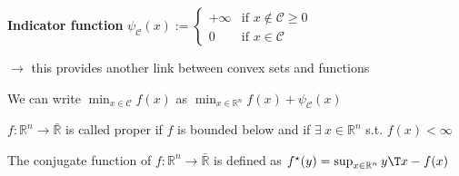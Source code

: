 \textbf{Indicator function}
$\psi_\mathcal{C}(x) := \begin{cases} +\infty &\text{if } x \notin\mathcal{C} \ge 0 \\ 0 &\text{if } x \in\mathcal{C} \end{cases}$

$\rightarrow$ this provides another link between convex sets and functions

We can write
$\min_{x \in \mathcal{C}}f(x)$ as
$\min_{x \in \mathbb{R}^{n}}f(x) + \psi_\mathcal{C}(x)$

\begin{definition}[3]
	$f: \mathbb{R}^{n}\rightarrow\bar{\mathbb{R}}$ is called proper
	if $f$ is bounded below and
	if $\exists\ x \in \mathbb{R}^{n}$ s.t. $f(x)<\infty$
\end{definition}

\begin{definition}
	The conjugate function of $f: \mathbb{R}^{n}\rightarrow\bar{\mathbb{R}}$  is defined as
	$f^\star(y)=\sup_{x \in \mathbb{R}^{n}}y\T x-f(x)$
\end{definition}


